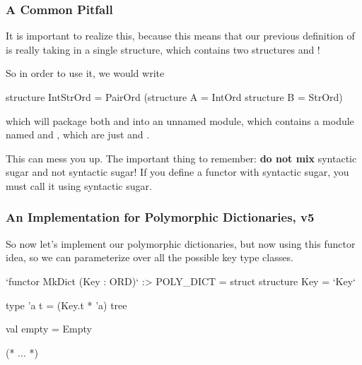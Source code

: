 \documentclass[aspectratio=169, handout]{beamer}
\begin{document}
\begin{frame}[fragile]
  \frametitle{A Common Pitfall}

  It is important to realize this, because this means that our previous definition
  of  is really taking in a single structure, which contains two
  structures  and !

  \pause
  \vspace{\fill}

  So in order to use it, we would write
  \begin{codeblock}
    structure IntStrOrd = PairOrd (structure A = IntOrd
                                   structure B = StrOrd)
  \end{codeblock}

  which will package both  and  into an unnamed
  module, which contains a module named  and , which are just
   and .

  \pause
  \vspace{\fill}

  This can mess you up. The important thing to remember: \textbf{do not mix}
  syntactic sugar and not syntactic sugar! If you define a functor with syntactic
  sugar, you must call it using syntactic sugar.
\end{frame}

\begin{frame}[fragile]
  \frametitle{An Implementation for Polymorphic Dictionaries, v5}

  So now let's implement our polymorphic dictionaries, but now using this
  functor idea, so we can parameterize over all the possible key type classes.

  \pause
  \vspace{\fill}

  \begin{codeblock}
    `functor MkDict (Key : ORD)` :> POLY_DICT =
      struct
        structure Key = `Key`

        type 'a t = (Key.t * 'a) tree

        val empty = Empty

      (* ... *)
  \end{codeblock}
\end{frame}
\end{document}
